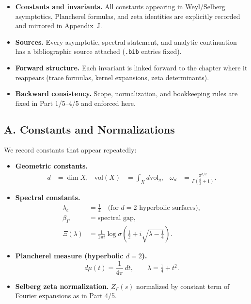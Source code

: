 \begin{tcolorbox}[colback=gray!5,colframe=gray!35,title=Audit Discipline (MEA-Core-SS • enforced)]
\begin{itemize}
  \item \textbf{Constants and invariants.} All constants appearing in Weyl/Selberg asymptotics,
        Plancherel formulas, and zeta identities are explicitly recorded and mirrored in Appendix~J.
  \item \textbf{Sources.} Every asymptotic, spectral statement, and analytic continuation
        has a bibliographic source attached (\texttt{.bib} entries fixed).
  \item \textbf{Forward structure.} Each invariant is linked forward to the chapter
        where it reappears (trace formulas, kernel expansions, zeta determinants).
  \item \textbf{Backward consistency.} Scope, normalization, and bookkeeping rules are
        fixed in Part 1/5–4/5 and enforced here.
\end{itemize}
\end{tcolorbox}

\subsection*{A. Constants and Normalizations}
\label{subsec:constants}

We record constants that appear repeatedly:

\begin{itemize}
  \item \textbf{Geometric constants.}
        \begin{align*}
          d &= \dim X, &
          \mathrm{vol}(X) &= \int_X d\mathrm{vol}_g, &
          \omega_d &= \frac{\pi^{d/2}}{\Gamma(\tfrac d2+1)}.
        \end{align*}

  \item \textbf{Spectral constants.}
        \begin{align*}
          \lambda_c &= \tfrac14 \quad \text{(for $d=2$ hyperbolic surfaces)}, \\
          \beta_\Gamma &= \text{spectral gap}, \\
          \Xi(\lambda) &= \tfrac{1}{2\pi i}\log\sigma(\tfrac12+i\sqrt{\lambda-\tfrac14}).
        \end{align*}

  \item \textbf{Plancherel measure (hyperbolic $d=2$).}
        \[
          d\mu(t) = \frac{1}{4\pi}\,dt, \qquad \lambda=\tfrac14+t^2.
        \]

  \item \textbf{Selberg zeta normalization.}
        $Z_\Gamma(s)$ normalized by constant term of Fourier expansions as in Part 4/5.
\end{itemize}

